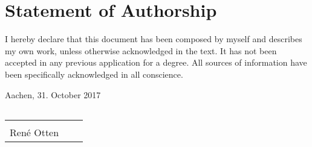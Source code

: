 \chapter*{Statement of Authorship}

I hereby declare that this document has been composed by myself and describes my own
work, unless otherwise acknowledged in the text. It has not been accepted in any previous
application for a degree. All sources of information have been specifically acknowledged in
all conscience.




\vspace{3cm}

Aachen, 31. October 2017
\newline
\vspace*{3,5 cm} 
\begin{tabular}{p{7cm}p{.5cm}l}
\end{tabular}%
\hfill 
\begin{tabular}{p{7cm}p{.5cm}l}
\dotfill \\ 
René Otten
\end{tabular} 